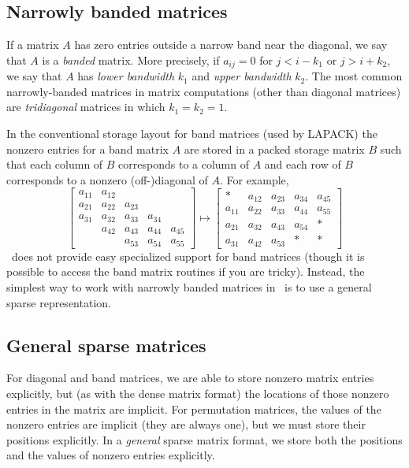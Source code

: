 \subsection{Narrowly banded matrices}

If a matrix $A$ has zero entries outside a narrow band near the
diagonal, we say that $A$ is a {\em banded} matrix.  More precisely,
if $a_{ij} = 0$ for $j < i-k_1$ or $j > i+k_2$, we say that $A$
has {\em lower bandwidth} $k_1$ and {\em upper bandwidth} $k_2$.
The most common narrowly-banded matrices in matrix computations
(other than diagonal matrices) are {\em tridiagonal} matrices in
which $k_1 = k_2 = 1$.

In the conventional storage layout for band matrices (used by LAPACK)
the nonzero entries for a band matrix $A$ are stored in a packed
storage matrix $B$ such that each column of $B$ corresponds to a column
of $A$ and each row of $B$ corresponds to a nonzero (off-)diagonal of $A$.
For example,
\[
  \begin{bmatrix}
    a_{11} & a_{12} \\
    a_{21} & a_{22} & a_{23} \\
    a_{31} & a_{32} & a_{33} & a_{34} \\
    & a_{42} & a_{43} & a_{44} & a_{45} \\
    & & a_{53} & a_{54} & a_{55}
  \end{bmatrix} \mapsto
  \begin{bmatrix}
    * & a_{12} & a_{23} & a_{34} & a_{45} \\
    a_{11} & a_{22} & a_{33} & a_{44} & a_{55} \\
    a_{21} & a_{32} & a_{43} & a_{54} & * \\
    a_{31} & a_{42} & a_{53} & * & *
  \end{bmatrix}
\]
\matlab\ does not provide easy specialized support for band matrices
(though it is possible to access the band matrix routines if you
are tricky).  Instead, the simplest way to work with narrowly banded
matrices in \matlab\ is to use a general sparse representation.

\subsection{General sparse matrices}

For diagonal and band matrices, we are able to store nonzero matrix
entries explicitly, but (as with the dense matrix format) the locations
of those nonzero entries in the matrix are implicit.  For permutation
matrices, the values of the nonzero entries are implicit (they are
always one), but we must store their positions explicitly.  In a
{\em general} sparse matrix format, we store both the positions and
the values of nonzero entries explicitly.

